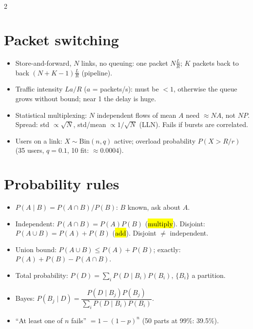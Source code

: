 \begin{multicols}{2}
\section{Packet switching}
\begin{itemize}
  \item Store-and-forward, $N$ links, no queuing: one packet $N\frac LR$; $K$ packets back to back $(N+K-1)\frac LR$ (pipeline).
  \item Traffic intensity $La/R$ ($a$ = packets/s): must be $<1$, otherwise the queue grows without bound; near 1 the delay is huge.
  \item Statistical multiplexing: $N$ independent flows of mean $A$ need $\approx NA$, not $NP$. Spread: std $\propto\sqrt N$, std/mean $\propto1/\sqrt N$ (LLN). Fails if bursts are correlated.
  \item Users on a link: $X\sim\text{Bin}(n,q)$ active; overload probability $P(X>R/r)$ (35 users, $q=0.1$, 10 fit: $\approx0.0004$).
\end{itemize}

\section{Probability rules}
\begin{itemize}
  \item $P(A\mid B)=P(A\cap B)/P(B)$: $B$ known, ask about $A$.
  \item Independent: $P(A\cap B)=P(A)P(B)$ (\hl{multiply}). Disjoint: $P(A\cup B)=P(A)+P(B)$ (\hl{add}). Disjoint $\neq$ independent.
  \item Union bound: $P(A\cup B)\le P(A)+P(B)$; exactly: $P(A)+P(B)-P(A\cap B)$.
  \item Total probability: $P(D)=\sum_iP(D\mid B_i)P(B_i)$, $\{B_i\}$ a partition.
  \item Bayes: $P(B_j\mid D)=\dfrac{P(D\mid B_j)P(B_j)}{\sum_iP(D\mid B_i)P(B_i)}$.
  \item ``At least one of $n$ fails'' $=1-(1-p)^n$ (50 parts at 99\%: 39.5\%).
\end{itemize}


\end{multicols}
